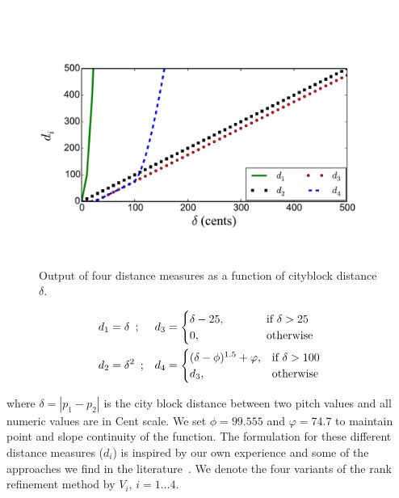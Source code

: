 \begin{figure}
	\begin{center}
		\includegraphics[width=\figSizeEightyFive]{ch06_patterns/figures/discovery/distances.pdf}
	\end{center}
	\caption{Output of four distance measures as a function of cityblock distance $\delta$. }
	\label{fig:Distances_DTW_discovery}
\end{figure}


\begin{equation}
\begin{aligned}
d_1& = \delta \hspace{.5em};&
d_3& = 
\begin{cases}
\delta-25, & \hspace{1cm} \text{if } \delta >25\\
0, & \hspace{1cm}\text{otherwise } 
\end{cases}
\\
d_2& = \delta^2 \hspace{.5em};&
d_4 &= 
\begin{cases}
(\delta-\phi)^{1.5} + \varphi, & \text{if } \delta >100\\
d_3, & \text{otherwise}
\end{cases}
\end{aligned}
\label{eq:distance_measures_discovery}
\end{equation}

\noindent where $\delta = |p_1-p_2|$ is the city block distance between two pitch values and all numeric values are in Cent scale. We set $\phi =99.555$ and $\varphi = 74.7$ to maintain point and slope continuity of the function. The formulation for these different distance measures ($d_i$) is inspired by our own experience and some of the approaches we find in the literature~\citep{Ishwar2013,Rao2014}. We denote the four variants of the rank refinement method by $V_i$, $i=1\dots 4$.


